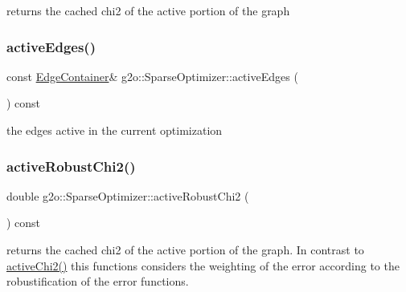 returns the cached chi2 of the active portion of the graph \mbox{\label{classg2o_1_1_sparse_optimizer_a44edae09e8d4b2b1f7ed5b9d791f9459}} 
\subsubsection{\texorpdfstring{active\+Edges()}{activeEdges()}}
{\footnotesize\ttfamily const \mbox{\hyperlink{structg2o_1_1_optimizable_graph_a2b43e807ae6d61ef8749ca1ef7c25f62}{Edge\+Container}}\& g2o\+::\+Sparse\+Optimizer\+::active\+Edges (\begin{DoxyParamCaption}{ }\end{DoxyParamCaption}) const\hspace{0.3cm}{\ttfamily [inline]}}



the edges active in the current optimization 

\mbox{\label{classg2o_1_1_sparse_optimizer_a9a8950d87cbbfe991b5f6381db19593c}} 
\subsubsection{\texorpdfstring{active\+Robust\+Chi2()}{activeRobustChi2()}}
{\footnotesize\ttfamily double g2o\+::\+Sparse\+Optimizer\+::active\+Robust\+Chi2 (\begin{DoxyParamCaption}{ }\end{DoxyParamCaption}) const}

returns the cached chi2 of the active portion of the graph. In contrast to \mbox{\hyperlink{classg2o_1_1_sparse_optimizer_ab64abc4e84ba0fd8f55dbd12477ef76d}{active\+Chi2()}} this functions considers the weighting of the error according to the robustification of the error functions. \mbox{\label{classg2o_1_1_sparse_optimizer_a9843e19ec85c9f6598e52d7223e54e75}} 

